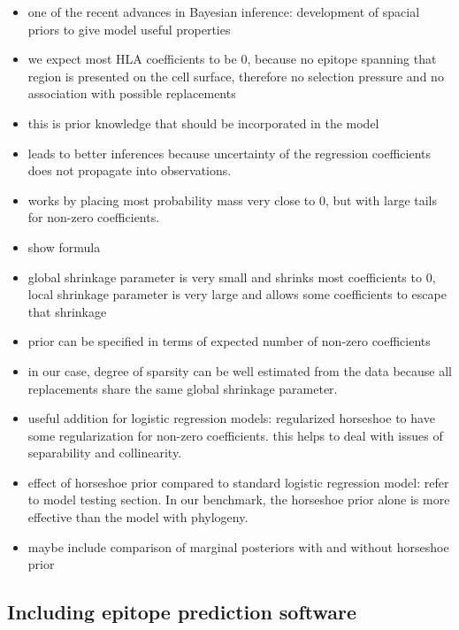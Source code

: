 \documentclass[fleqn,11pt]{SelfArx} %
\begin{document}
\begin{itemize}
  \item one of the recent advances in Bayesian inference: development of
    spacial priors to give model useful properties
  \item we expect most HLA coefficients to be 0, because no epitope spanning that region
    is presented on the cell surface, therefore no selection pressure and no association
    with possible replacements
  \item this is prior knowledge that should be incorporated in the model
  \item leads to better inferences because uncertainty of the regression coefficients
    does not propagate into observations.
  \item works by placing most probability mass very close to 0, but with large tails
    for non-zero coefficients.
  \item show formula
  \item global shrinkage parameter is very small and shrinks most coefficients to 0,
    local shrinkage parameter is very large and allows some coefficients to escape that 
    shrinkage
  \item prior can be specified in terms of expected number of non-zero coefficients
  \item in our case, degree of sparsity can be well estimated from the data because all
    replacements share the same global shrinkage parameter.
  \item useful addition for logistic regression models: regularized horseshoe
    to have some regularization for non-zero coefficients. this helps to deal with
    issues of separability and collinearity.
  \item effect of horseshoe prior compared to standard logistic regression model:
    refer to model testing section. In our benchmark, the horseshoe prior alone is more
    effective than the model with phylogeny.
  \item maybe include comparison of marginal posteriors with and without horseshoe prior
\end{itemize}

\subsection*{Including epitope prediction software}
\end{document}
